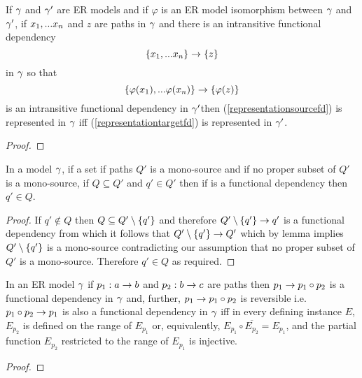 \begin{lemma}
If $\gamma$ and $\gamma'$ are ER models and  if  $\varphi$ is an ER model isomorphism between $\gamma$  and $\gamma'$,  if $x_1,...x_n$ and $z$ are paths in $\gamma$
and there is an  intransitive functional dependency
\begin{equation}
\label{representationsourcefd}
\left\{x_1,...x_n\right\} \rightarrow \left\{z\right\}
\end{equation} 
in $\gamma$
so that
\begin{equation}
\label{representationtargetfd}
\left\{\varphi(x_1),...\varphi(x_n)\right\} \rightarrow \left\{\varphi(z)\right\}
\end{equation}
is an intransitive  functional dependency in $\gamma'$then
(\ref{representationsourcefd}) is represented in $\gamma$ iff
(\ref{representationtargetfd}) is represented in $\gamma'$.
\end{lemma}
\begin{proof}
\tbd
\end{proof}

\begin{lemma}
In a model $\gamma$, if a set if paths $Q'$ is a mono-source and if no proper subset of $Q'$ is a mono-source, if $Q \subseteq Q'$ and $q' \in Q'$ then
if  is a functional dependency then $q' \in Q$.
\end{lemma}
\begin{proof}
If $q' \notin Q$ then $Q \subseteq Q' \setminus \left\{q'\right\}$ and therefore $Q' \setminus \left\{q'\right\} \rightarrow q'$ is a functional dependency from which it follows that
$Q' \setminus \left\{q'\right\} \rightarrow Q'$
which by lemma  implies $Q' \setminus \left\{q'\right\}$ is a mono-source contradicting our assumption that no proper subset of $Q'$ is a mono-source.
Therefore $q' \in Q$ as required.
\end{proof}


\begin{lemma}
In an ER model $\gamma$ if $p_1: a \rightarrow b$ and $p_2:b \rightarrow c$  are paths 
then $p_1 \rightarrow  p_1 \circ p_2$ is a functional dependency in $\gamma$ and, further, $p_1 \rightarrow p_1 \circ p_2$ is reversible i.e.
$p_1 \circ  p_2 \rightarrow p_1$ is also a functional dependency in $\gamma$ iff in every defining instance $E$, $E_{p_2}$ is defined on the range of $E_{p_1}$ or, equivalently,
$E_{p_1} \circ \overline{E_{p_2}} = E_{p_1}$,  and the partial function $E_{p_2}$ restricted to the range of $E_{p_1}$ is injective. 
\end{lemma}
\begin{proof}
\tbd
\end{proof}

